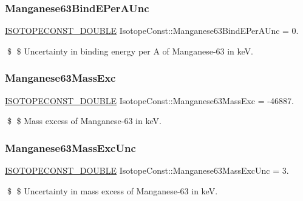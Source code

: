 \subsubsection{\texorpdfstring{Manganese63\+Bind\+E\+Per\+A\+Unc}{Manganese63BindEPerAUnc}}
{\footnotesize\ttfamily \mbox{\hyperlink{group___isotope_const-_macros_ga8f45a7272ce02c0b4c65c44636ed719a}{I\+S\+O\+T\+O\+P\+E\+C\+O\+N\+S\+T\+\_\+\+D\+O\+U\+B\+LE}} Isotope\+Const\+::\+Manganese63\+Bind\+E\+Per\+A\+Unc = 0.}

\$ \$ Uncertainty in binding energy per A of Manganese-\/63 in keV. \mbox{\label{group___isotope_const-_manganese-_mn63_ga10165bbe003d03783eda1d513cc4f8e3}} 
\subsubsection{\texorpdfstring{Manganese63\+Mass\+Exc}{Manganese63MassExc}}
{\footnotesize\ttfamily \mbox{\hyperlink{group___isotope_const-_macros_ga8f45a7272ce02c0b4c65c44636ed719a}{I\+S\+O\+T\+O\+P\+E\+C\+O\+N\+S\+T\+\_\+\+D\+O\+U\+B\+LE}} Isotope\+Const\+::\+Manganese63\+Mass\+Exc = -\/46887.}

\$ \$ Mass excess of Manganese-\/63 in keV. \mbox{\label{group___isotope_const-_manganese-_mn63_ga0935588335c475b79b9eef7d5bcd8911}} 
\subsubsection{\texorpdfstring{Manganese63\+Mass\+Exc\+Unc}{Manganese63MassExcUnc}}
{\footnotesize\ttfamily \mbox{\hyperlink{group___isotope_const-_macros_ga8f45a7272ce02c0b4c65c44636ed719a}{I\+S\+O\+T\+O\+P\+E\+C\+O\+N\+S\+T\+\_\+\+D\+O\+U\+B\+LE}} Isotope\+Const\+::\+Manganese63\+Mass\+Exc\+Unc = 3.}

\$ \$ Uncertainty in mass excess of Manganese-\/63 in keV. \mbox{\label{group___isotope_const-_manganese-_mn63_gaedfbbef015548d14688c2ea5fb154abc}} 
